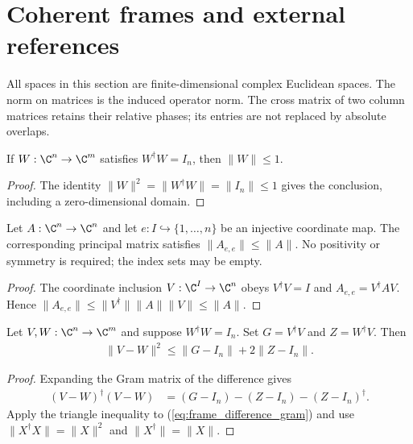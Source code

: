 \section{Coherent frames and external references}
\label{sec:coherent_frames}

All spaces in this section are finite-dimensional complex Euclidean spaces.
The norm on matrices is the induced operator norm. The cross matrix of two
column matrices retains their relative phases; its entries are not replaced
by absolute overlaps.

\begin{theorem}
    \label{thm:frame_isometry_norm}
    \leanok
    If $W:\C^n\to\C^m$ satisfies $W^\dagger W=I_n$, then $\|W\|\le1$.
\end{theorem}
\begin{proof}\leanok
    The identity $\|W\|^2=\|W^\dagger W\|=\|I_n\|\le1$ gives the conclusion,
    including a zero-dimensional domain.
\end{proof}

\begin{lemma}
    \label{lem:principal_submatrix_norm}
    \leanok
    Let $A:\C^n\to\C^n$ and let $e:I\hookrightarrow\{1,\ldots,n\}$
    be an injective coordinate map. The corresponding principal matrix
    satisfies $\|A_{e,e}\|\leq\|A\|$. No positivity or symmetry is required;
    the index sets may be empty.
\end{lemma}
\begin{proof}\leanok
    The coordinate inclusion $V:\C^I\to\C^n$ obeys $V^\dagger V=I$ and
    $A_{e,e}=V^\dagger AV$. Hence
    $\|A_{e,e}\|\leq\|V^\dagger\|\|A\|\|V\|\leq\|A\|$.
\end{proof}

\begin{theorem}
    \label{thm:frame_gram_cross_bound}
    \leanok
    Let $V,W:\C^n\to\C^m$ and suppose $W^\dagger W=I_n$. Set
    $G=V^\dagger V$ and $Z=W^\dagger V$. Then
    \begin{align}
        \|V-W\|^2\le\|G-I_n\|+2\|Z-I_n\|.
        \label{eq:frame_gram_cross_bound}
    \end{align}
\end{theorem}
\begin{proof}\leanok
    Expanding the Gram matrix of the difference gives
    \begin{align}
        (V-W)^\dagger(V-W)
         & =(G-I_n)-(Z-I_n)-(Z-I_n)^\dagger.
        \label{eq:frame_difference_gram}
    \end{align}
    Apply the triangle inequality to (\ref{eq:frame_difference_gram}) and use
    $\|X^\dagger X\|=\|X\|^2$ and $\|X^\dagger\|=\|X\|$.
\end{proof}

